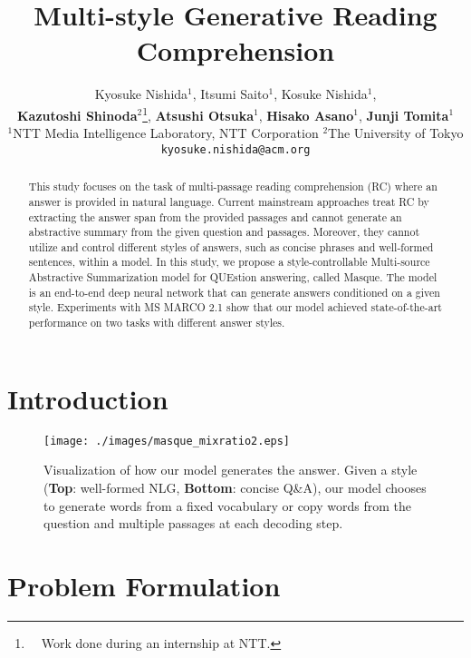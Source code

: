 \documentclass[11pt,a4paper]{article}
\theoremstyle{mydef}
\theoremstyle{myprob}
\begin{document}
\title{Multi-style Generative Reading Comprehension}

\author{Kyosuke Nishida$^1$,
Itsumi Saito$^1$,
Kosuke Nishida$^1$,
\\{\bf Kazutoshi Shinoda}$^2$\thanks{\ \ Work done during an internship at NTT.},
{\bf Atsushi Otsuka}$^1$,
{\bf Hisako Asano}$^1$,
{\bf Junji Tomita}$^1$\\
  $^1$NTT Media Intelligence Laboratory, NTT Corporation \hspace{1.5em}  $^2$The University of Tokyo\\
  {\tt kyosuke.nishida@acm.org}
}

\date{}

\maketitle
\begin{abstract}
This study focuses on the task of multi-passage reading comprehension (RC) where an answer is provided in natural language. Current mainstream approaches treat RC by extracting the answer span from the provided passages and cannot generate an abstractive summary from the given question and passages. Moreover, they cannot utilize and control different styles of answers, such as concise phrases and well-formed sentences, within a model.
In this study, we propose a style-controllable Multi-source Abstractive Summarization model for QUEstion answering, called Masque. The model is an end-to-end deep neural network that can generate answers conditioned on a given style.
Experiments with MS MARCO 2.1 show that our model achieved state-of-the-art performance
on two tasks with different answer styles.
\end{abstract}

\section{Introduction}

\begin{figure}[t!]
\centering
\texttt{[image: ./images/masque\_mixratio2.eps]}
\caption{Visualization of how our model generates the answer. Given a style (\textbf{Top}: well-formed NLG, \textbf{Bottom}: concise Q\&A), our model chooses to generate words from a fixed vocabulary or copy words from the question and multiple passages at each decoding step.
}
\label{fig:mixratio}
\end{figure}

\section{Problem Formulation}
\end{document}
